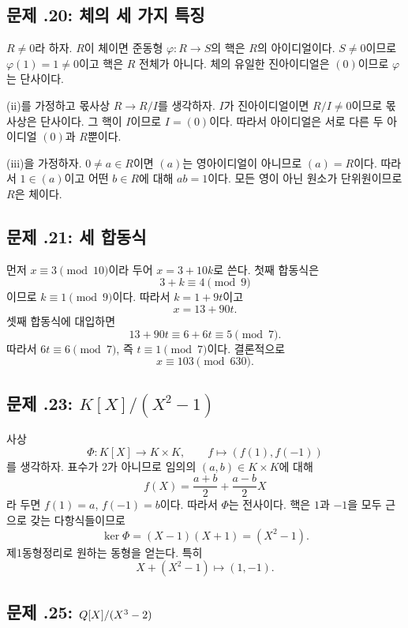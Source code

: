 \subsection*{문제 \thechapter.20: 체의 세 가지 특징}

\begin{solution}
$R\ne0$라 하자. $R$이 체이면 준동형 $\varphi:R\to S$의 핵은 $R$의 아이디얼이다. $S\ne0$이므로 $\varphi(1)=1\ne0$이고 핵은 $R$ 전체가 아니다. 체의 유일한 진아이디얼은 $(0)$이므로 $\varphi$는 단사이다.

(ii)를 가정하고 몫사상 $R\to R/I$를 생각하자. $I$가 진아이디얼이면 $R/I\ne0$이므로 몫사상은 단사이다. 그 핵이 $I$이므로 $I=(0)$이다. 따라서 아이디얼은 서로 다른 두 아이디얼 $(0)$과 $R$뿐이다.

(iii)을 가정하자. $0\ne a\in R$이면 $(a)$는 영아이디얼이 아니므로 $(a)=R$이다. 따라서 $1\in(a)$이고 어떤 $b\in R$에 대해 $ab=1$이다. 모든 영이 아닌 원소가 단위원이므로 $R$은 체이다.
\end{solution}

\subsection*{문제 \thechapter.21: 세 합동식}

\begin{solution}
먼저 $x\equiv3\pmod{10}$이라 두어 $x=3+10k$로 쓴다. 첫째 합동식은
\[
  3+k\equiv4\pmod9
\]
이므로 $k\equiv1\pmod9$이다. 따라서 $k=1+9t$이고
\[
  x=13+90t.
\]
셋째 합동식에 대입하면
\[
  13+90t\equiv6+6t\equiv5\pmod7.
\]
따라서 $6t\equiv6\pmod7$, 즉 $t\equiv1\pmod7$이다. 결론적으로
\[
  x\equiv103\pmod{630}.
\]
\end{solution}

\subsection*{문제 \thechapter.23: $K[X]/(X^2-1)$}

\begin{solution}
사상
\[
  \Phi:K[X]\to K\times K,
  \qquad f\mapsto(f(1),f(-1))
\]
를 생각하자. 표수가 $2$가 아니므로 임의의 $(a,b)\in K\times K$에 대해
\[
  f(X)=\frac{a+b}{2}+\frac{a-b}{2}X
\]
라 두면 $f(1)=a$, $f(-1)=b$이다. 따라서 $\Phi$는 전사이다. 핵은 $1$과 $-1$을 모두 근으로 갖는 다항식들이므로
\[
  \ker\Phi=(X-1)(X+1)=(X^2-1).
\]
제1동형정리로 원하는 동형을 얻는다. 특히
\[
  X+(X^2-1)\longmapsto(1,-1).
\]
\end{solution}

\subsection*{문제 \thechapter.25: $Q[X]/(X^3-2)$}

